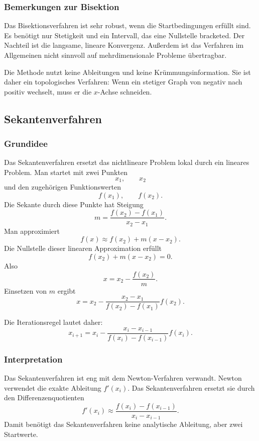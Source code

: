 \documentclass[10pt, letterpaper]{article}
\begin{document}
\subsubsection{Bemerkungen zur Bisektion}

Das Bisektionsverfahren ist sehr robust, wenn die Startbedingungen erfüllt sind. Es benötigt nur Stetigkeit und ein Intervall, das eine Nullstelle bracketed. Der Nachteil ist die langsame, lineare Konvergenz. Außerdem ist das Verfahren im Allgemeinen nicht sinnvoll auf mehrdimensionale Probleme übertragbar.

Die Methode nutzt keine Ableitungen und keine Krümmungsinformation. Sie ist daher ein topologisches Verfahren: Wenn ein stetiger Graph von negativ nach positiv wechselt, muss er die \(x\)-Achse schneiden.

\subsection{Sekantenverfahren}

\subsubsection{Grundidee}

Das Sekantenverfahren ersetzt das nichtlineare Problem lokal durch ein lineares Problem. Man startet mit zwei Punkten
\[
x_1,\qquad x_2
\]
und den zugehörigen Funktionswerten
\[
f(x_1),\qquad f(x_2).
\]
Die Sekante durch diese Punkte hat Steigung
\[
m=
\frac{f(x_2)-f(x_1)}{x_2-x_1}.
\]
Man approximiert
\[
f(x)\approx f(x_2)+m(x-x_2).
\]
Die Nullstelle dieser linearen Approximation erfüllt
\[
f(x_2)+m(x-x_2)=0.
\]
Also
\[
x=x_2-\frac{f(x_2)}{m}.
\]
Einsetzen von \(m\) ergibt
\[
x=x_2-
\frac{x_2-x_1}{f(x_2)-f(x_1)}
f(x_2).
\]

Die Iterationsregel lautet daher:
\[
\boxed{
x_{i+1}
=
x_i
-
\frac{x_i-x_{i-1}}
{f(x_i)-f(x_{i-1})}
f(x_i).
}
\]

\subsubsection{Interpretation}

Das Sekantenverfahren ist eng mit dem Newton-Verfahren verwandt. Newton verwendet die exakte Ableitung \(f'(x_i)\). Das Sekantenverfahren ersetzt sie durch den Differenzenquotienten
\[
f'(x_i)
\approx
\frac{f(x_i)-f(x_{i-1})}{x_i-x_{i-1}}.
\]
Damit benötigt das Sekantenverfahren keine analytische Ableitung, aber zwei Startwerte.
\end{document}
